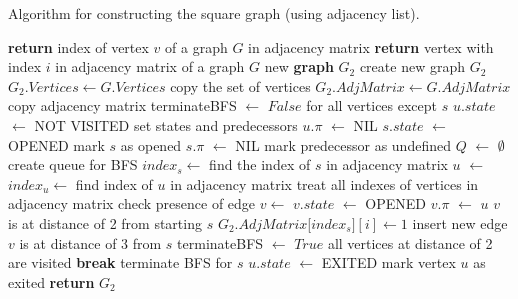 \documentclass[11pt]{article}
\begin{document}
\begin{algorithm}
\caption{Algorithm for constructing the square graph (using adjacency list).}
\begin{algorithmic}[1]
\State \textbf{return} index of vertex $v$ of a graph $G$ in adjacency matrix
\EndProcedure
\Statex
{}
\State \textbf{return} vertex with index $i$ in adjacency matrix of a graph $G$ 
\EndProcedure
\Statex
{}
\State new \textbf{graph} $G_{2}$ \Comment create new graph $G_{2}$ 
\State $G_{2}.Vertices \gets G.Vertices$ \Comment copy the set of vertices
\State $G_{2}.AdjMatrix \gets G.AdjMatrix$ \Comment copy adjacency matrix   
\State terminateBFS $\gets$ $False$
 \Comment for all vertices except $s$
\State $u.state$ $\gets$ NOT VISITED \Comment set states and predecessors 
\State $u.\pi$ $\gets$ NIL 
\EndFor
\State $s.state$ $\gets$ OPENED \Comment mark $s$ as opened
\State $s.\pi$ $\gets$ NIL  \Comment mark predecessor as undefined
\State $Q$ $\gets$ $\emptyset$ \Comment create queue for BFS
\State {} 
\State $index_{s} \gets $  \Comment find the index of $s$ in adjacency matrix
\State $u$ $\gets$  
\State $index_{u} \gets$  \Comment find index of $u$ in adjacency matrix
 \Comment treat all indexes of vertices in adjacency matrix
 \Comment check presence of edge
\State $v \gets$  
\State $v.state$ $\gets$ OPENED 
\State $v.\pi$ $\gets$ $u$ 
\State {} 
 \Comment $v$ is at distance of 2 from starting $s$
\State $G_{2}.AdjMatrix$[$index_{s}][i] \gets 1$ \Comment insert new edge
 \Comment $v$ is at distance of 3 from $s$
\State terminateBFS $\gets$ $True$ \Comment all vertices at distance of 2 are visited
\State \textbf{break} \Comment terminate BFS for $s$
\EndIf
\EndIf
\EndIf
\State $u.state$ $\gets$ EXITED \Comment mark vertex $u$ as exited
\EndFor
\EndWhile
\EndFor
\State \textbf{return} $G_{2}$
\EndProcedure
\end{algorithmic}
\end{algorithm}
\end{document}
